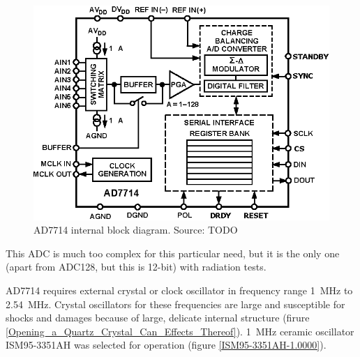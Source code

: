         \begin{figure}[H]
            \centering
            \includegraphics[width=0.5\paperwidth]{img/06/AD7714.eps}
            \caption{AD7714 internal block diagram. Source: TODO}
            \label{AD7714}
        \end{figure}

        This ADC is much too complex for this particular need, but it is the only one (apart from ADC128, but this is 12-bit) with radiation tests.

        AD7714 requires external crystal or clock oscillator in frequency range \SI{1}{\mega\hertz} to \SI{2.54}{\mega\hertz}. Crystal oscillators for these frequencies are large and susceptible for shocks and damages because of large, delicate internal structure (firure \ref{Opening_a_Quartz_Crystal_Can_Effects_Thereof}). \SI{1}{\mega\hertz} ceramic oscillator ISM95-3351AH was selected for operation (figure \ref{ISM95-3351AH-1.0000}).

